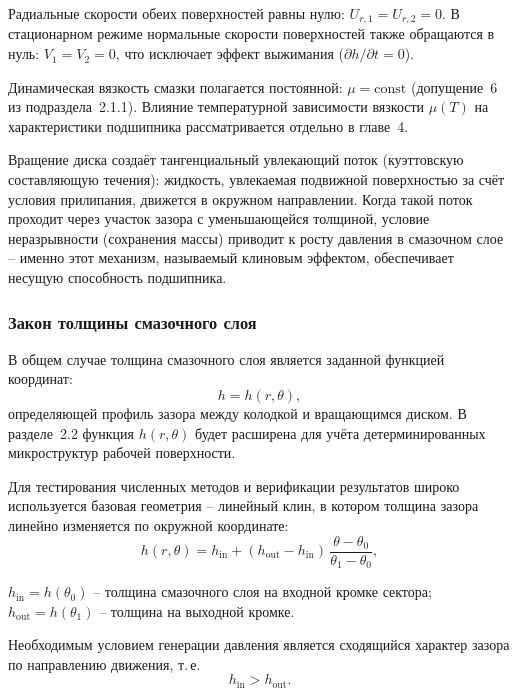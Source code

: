 Радиальные скорости обеих поверхностей равны нулю: $U_{r,1} = U_{r,2} = 0$. В стационарном режиме нормальные скорости поверхностей также обращаются в нуль: $V_1 = V_2 = 0$, что исключает эффект выжимания ($\partial h/\partial t = 0$).

Динамическая вязкость смазки полагается постоянной: $\mu = \mathrm{const}$ (допущение~6 из подраздела~2.1.1). Влияние температурной зависимости вязкости $\mu(T)$ на характеристики подшипника рассматривается отдельно в главе~4.

Вращение диска создаёт тангенциальный увлекающий поток (куэттовскую составляющую течения): жидкость, увлекаемая подвижной поверхностью за счёт условия прилипания, движется в окружном направлении. Когда такой поток проходит через участок зазора с уменьшающейся толщиной, условие неразрывности (сохранения массы) приводит к росту давления в смазочном слое -- именно этот механизм, называемый клиновым эффектом, обеспечивает несущую способность подшипника.


\subsubsection*{Закон толщины смазочного слоя}

В общем случае толщина смазочного слоя является заданной функцией координат:
\begin{equation}
h = h(r, \theta),
\label{eq:thrust_h_general}
\end{equation}
определяющей профиль зазора между колодкой и вращающимся диском. В разделе~2.2 функция $h(r,\theta)$ будет расширена для учёта детерминированных микроструктур рабочей поверхности.

Для тестирования численных методов и верификации результатов широко используется базовая геометрия -- линейный клин, в котором толщина зазора линейно изменяется по окружной координате:
\begin{equation}
h(r,\theta) = h_{\mathrm{in}} + (h_{\mathrm{out}} - h_{\mathrm{in}})\,\frac{\theta - \theta_0}{\theta_1 - \theta_0},
\label{eq:thrust_h_wedge}
\end{equation}
\begin{conditions}
$h_{\mathrm{in}} = h(\theta_0)$ -- толщина смазочного слоя на входной кромке сектора;\\
$h_{\mathrm{out}} = h(\theta_1)$ -- толщина на выходной кромке.
\end{conditions}
Необходимым условием генерации давления является сходящийся характер зазора по направлению движения, т.\,е.
\begin{equation}
h_{\mathrm{in}} > h_{\mathrm{out}}.
\label{eq:thrust_convergence_condition}
\end{equation}

